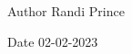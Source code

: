 \begin{DoxyAuthor}{Author}
Randi Prince 
\end{DoxyAuthor}
\begin{DoxyDate}{Date}
02-\/02-\/2023 
\end{DoxyDate}
